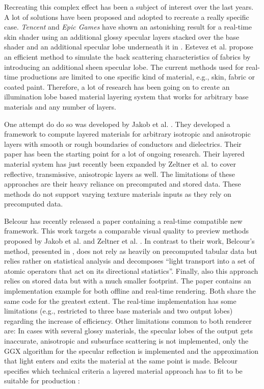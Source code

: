	Recreating this complex effect has been a subject of interest over the last years. A lot of solutions have been proposed and adopted to recreate a really specific case. \emph{Tencent} and \emph{Epic Games} have shown an astonishing result for a real-time skin shader using an additional glossy specular layers stacked over the base shader and an additional specular lobe underneath it in \cite{seymour2018StateOfUe}. Estevez et al. \cite[p.\,1]{estevez2017production} propose an efficient method to simulate the back scattering characteristics of fabrics by introducing an additional sheen specular lobe. The current methods used for real-time productions are limited to one specific kind of material, e.g., skin, fabric or coated paint. Therefore, a lot of research has been going on to create an illumination lobe based material layering system that works for arbitrary base materials and any number of layers.
	
	One attempt do do so was developed by Jakob et al. \cite{jakob2014comprehensive}. They developed a framework to compute layered materials for arbitrary isotropic and anisotropic layers with smooth or rough	boundaries of conductors and dielectrics. Their paper has been the starting point for a lot of ongoing research. Their layered material system has just recently been expanded by Zeltner et al. \cite{jakob2018labratory} to cover reflective, transmissive, anisotropic layers as well. The limitations of these approaches are their heavy reliance on precomputed and stored data. These methods do not support varying texture materials inputs as they rely on precomputed data. 
	
	Belcour has recently released a paper \cite{laurent2018efficient} containing a  real-time compatible new framework. This work targets a comparable visual quality to preview methods proposed by Jakob et al. \cite{jakob2014comprehensive} and Zeltner et al. \cite{jakob2018labratory}. In contrast to their work, Belcour's method, presented in \cite{laurent2018efficient}, does not rely as heavily on precomputed tabular data but relies rather on statistical analysis and decomposes ``light transport into a set of atomic operators that act on its directional statistics''. Finally, also this approach relies on stored data but with a much smaller footprint. The paper contains an implementation example for both offline and real-time rendering. Both share the same code for the greatest extent. The real-time implementation has some limitations (e.g., restricted to three base materials and two output lobes) regarding the increase of efficiency. Other limitations common to both renderer are: In cases with several glossy materials, the specular lobes of the output gets inaccurate, anisotropic and subsurface scattering is not implemented, only the GGX algorithm for the specular reflection is implemented and the approximation that light enters and exits the material at the same point is made. Belcour specifies which technical criteria a layered material approach has to fit to be suitable for production \cite[p.\,73]{laurent2018efficient}:     
	
